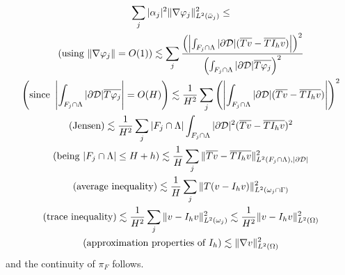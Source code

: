 \begin{multline*}
\sum_j|\alpha_j|^2\|\nabla \varphi _j\|^2_{L^2(\bar{\omega}_j)}\leq
\\
\left(\text{using }\|\nabla \varphi _j\|=O(1)\right) \lesssim  \sum_j \frac{\left(\left|\int_{F_j\cap \Lambda} |\partial\mathcal{D}| (\overline{Tv}-\overline{TI_hv})\right|\right)^2}{\left(\int_{F_j\cap \Lambda}|\partial\mathcal{D}|\overline{T\varphi_j}\right)^2}
\\
\left(\text{since }\left|\int_{F_j\cap \Lambda}|\partial\mathcal{D}|\overline{T\varphi_j}\right|=O(H)\right) \lesssim \frac {1}{H^2} \sum_j \left(\left|\int_{F_j\cap \Lambda} |\partial\mathcal{D}| (\overline{Tv}-\overline{TI_hv})\right| \right)^2
\\
(\text{Jensen}) \lesssim  \frac {1}{H^2} \sum_j |F_j\cap \Lambda| \int_{F_j\cap \Lambda} |\partial\mathcal{D}|^2(\overline{Tv}-\overline{TI_hv})^2
\\
(\text{being }|F_j\cap \Lambda| \leq H+h)\lesssim  \frac {1}{H} \sum_j \| \overline{Tv}-\overline{TI_hv}\|^2_{L^2(F_j\cap \Lambda), |\partial\mathcal{D}|}
\\
(\text{average inequality}) \lesssim  \frac {1}{H} \sum_j \| T(v-I_hv)\|^2_{L^2(\omega _j\cap \Gamma)}  
\\
\left(\text{trace inequality} \right)\lesssim  \frac {1}{H^2} \sum_j  \| v-I_h v\|^2_{L^2(\omega_j)} \lesssim  \frac {1}{H^2}  \| v-I_h v\|^2_{L^2(\Omega)} 
\\
(\text{approximation properties of }I_h)\lesssim \|\nabla  v\|^2_{L^2(\Omega)}
\end{multline*}
and the continuity of $\pi_F$ follows.

